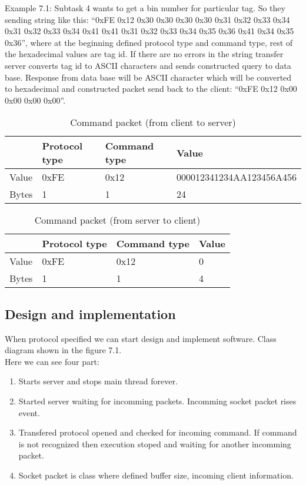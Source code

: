 Example 7.1: Subtask 4 wants to get a bin number for particular tag. So they sending string like this: 
“0xFE 0x12 0x30 0x30 0x30 0x30 0x31 0x32 0x33 0x34 0x31 0x32 0x33 0x34 0x41 0x41 0x31 0x32 0x33 0x34 0x35 0x36 0x41 0x34 0x35 0x36”, where at the beginning defined protocol type and command type, rest of the hexadecimal values are tag id. If there are no errors in the string transfer server converts tag id to ASCII characters and sends constructed query to data base. Response from data base will be ASCII character which will be converted to hexadecimal and constructed packet send back to the client: “0xFE 0x12 0x00 0x00 0x00 0x00”.

\begin{table}[h]
	\centering
    \begin{tabular}{ | p{1cm} | p{3cm} | p{3cm} | p{5cm} |}
    \hline
	& \textbf{Protocol type} & \textbf{Command type} & \textbf{Value}  \\ \hline
	Value & 0xFE & 0x12 & 000012341234AA123456A456 \\ \hline
	Bytes & 1 & 1 & 24  \\ \hline
    \end{tabular}
	\caption{Command packet (from client to server)}
	\label{tab:AdDis}
\end{table}

\begin{table}[h]
	\centering
    \begin{tabular}{ | p{1cm} | p{3cm} | p{3cm} | p{5cm} |}
    \hline
	& \textbf{Protocol type} & \textbf{Command type} & \textbf{Value}  \\ \hline
	Value & 0xFE & 0x12 & 0 \\ \hline
	Bytes & 1 & 1 & 4  \\ \hline
    \end{tabular}
	\caption{Command packet (from server to client)}
	\label{tab:AdDis}
\end{table}

\subsection{Design and implementation}

When protocol specified we can start design and implement software. Class diagram shown in the figure 7.1. \\ Here we can see four part:

\begin{enumerate}
	\item Starts server and stops main thread forever.
	\item Started server waiting for incomming packets. Incomming socket packet rises event.
	\item Transfered protocol opened and checked for incoming command. If command is not recognized then execution stoped and waiting for another incomming packet.
	\item Socket packet is class where defined buffer size, incoming client information.
\end{enumerate}

